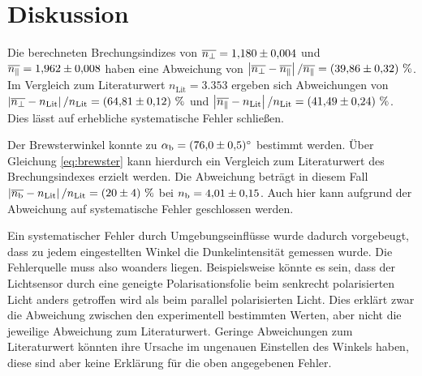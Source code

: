 \section{Diskussion}
Die berechneten Brechungsindizes von $\overline{n_\perp} = \num{1.180 \pm 0.004} $
und $\overline{n_\parallel} = \num{1.962 \pm 0.008}$ haben eine Abweichung von 
$\left|\overline{n_\perp} - \overline{n_\parallel}\right|/\overline{n_\parallel} = \left(\num{39.86 +- 0.32}\right) \, \%$.
Im Vergleich zum Literaturwert \cite{si_n} $n_\text{Lit} = \num{3.353}$ ergeben sich Abweichungen von
$\left|\overline{n_\perp} - n_\text{Lit}\right|/n_\text{Lit} = \left(\num{64.81 +- 0.12}\right) \, \%$
und $\left|\overline{n_\parallel} - n_\text{Lit}\right|/n_\text{Lit} = \left(\num{41.49+-0.24}\right) \, \%$.
Dies lässt auf erhebliche systematische Fehler schließen.

\noindent
Der Brewsterwinkel konnte zu $\alpha_\text{b} = \qty{76 \pm 0.5}{\degree}$ bestimmt werden.
Über Gleichung \eqref{eq:brewster} kann hierdurch ein Vergleich zum Literaturwert des Brechungsindexes erzielt werden.
Die Abweichung beträgt in diesem Fall
$\left|\overline{n_\text{b}} - n_\text{Lit}\right|/n_\text{Lit} = \left(\num{20+-4}\right) \, \%$
bei $n_\text{b} = \num{4.01 \pm 0.15}$.
Auch hier kann aufgrund der Abweichung auf systematische Fehler geschlossen werden.

\noindent
Ein systematischer Fehler durch Umgebungseinflüsse wurde dadurch vorgebeugt, dass zu jedem eingestellten Winkel die Dunkelintensität gemessen wurde.
Die Fehlerquelle muss also woanders liegen.
Beispielsweise könnte es sein, dass der Lichtsensor durch eine geneigte Polarisationsfolie beim senkrecht polarisierten Licht anders getroffen wird als beim parallel
polarisierten Licht. 
Dies erklärt zwar die Abweichung zwischen den experimentell bestimmten Werten, aber nicht die jeweilige Abweichung zum Literaturwert.
Geringe Abweichungen zum Literaturwert könnten ihre Ursache im ungenauen Einstellen des Winkels haben, diese sind aber keine Erklärung für die oben angegebenen Fehler.



